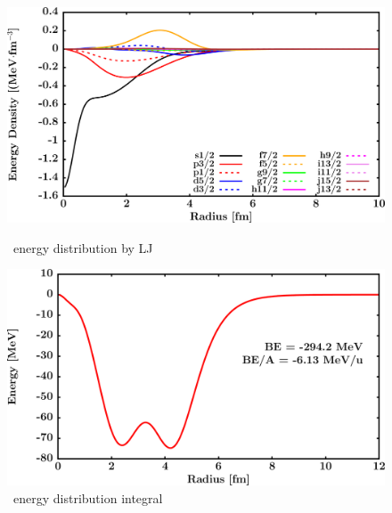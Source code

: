 \begin{figure}[hbtp]
    \centering
    \begin{minipage}{0.45\textwidth}
        \centering
        \includegraphics[width=\textwidth]{figures/ca48_EnergyDist.png}
        \caption*{\caEight\ energy distribution by LJ}
        \label{DOMFitData_ca48_proton_energyDistInt}
    \end{minipage}\hspace{6pt}
    \begin{minipage}{0.45\textwidth}
        \centering
        \includegraphics[width=\textwidth]{figures/ca48_EnergyDistIntegral.png}
        \caption*{\caEight\ energy distribution integral}
        \label{DOMFitData_ca48_neutron_energyDistInt}
    \end{minipage}
\end{figure}
\vspace{0.4in}

